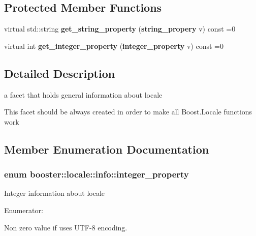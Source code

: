 \subsection*{\-Protected \-Member \-Functions}
\begin{DoxyCompactItemize}
\item 
virtual std\-::string {\bf get\-\_\-string\-\_\-property} ({\bf string\-\_\-propery} v) const =0
\item 
virtual int {\bf get\-\_\-integer\-\_\-property} ({\bf integer\-\_\-property} v) const =0
\end{DoxyCompactItemize}


\subsection{\-Detailed \-Description}
a facet that holds general information about locale 

\-This facet should be always created in order to make all \-Boost.\-Locale functions work 

\subsection{\-Member \-Enumeration \-Documentation}
\subsubsection[{integer\-\_\-property}]{\setlength{\rightskip}{0pt plus 5cm}enum {\bf booster\-::locale\-::info\-::integer\-\_\-property}}\label{classbooster_1_1locale_1_1info_ad613831a52d478f9f91e1fbebfd6d70f}
\-Integer information about locale \begin{Desc}
\item[\-Enumerator\-: ]\par
\begin{description}
\item[{\em 
utf8\-\_\-property\label{classbooster_1_1locale_1_1info_ad613831a52d478f9f91e1fbebfd6d70fa27fe34152b30e2f01b4f39e953215bfa}
}]\-Non zero value if uses \-U\-T\-F-\/8 encoding. \end{description}
\end{Desc}

